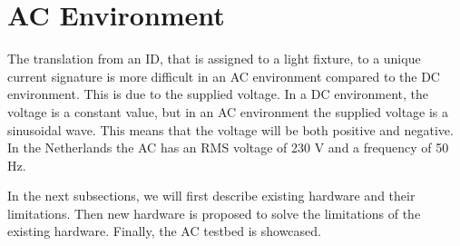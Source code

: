 
\section{AC Environment}
\label{sec:ac-environment}




The translation from an ID, that is assigned to a light fixture, to a unique current signature is more difficult in an AC environment compared to the DC environment.
This is due to the supplied voltage.
In a DC environment, the voltage is a constant value, but in an AC environment the supplied voltage is a sinusoidal wave.
This means that the voltage will be both positive and negative.
In the Netherlands the AC has an RMS voltage of 230 V and a frequency of 50 Hz.

In the next subsections, we will first describe existing hardware and their limitations.
Then new hardware is proposed to solve the limitations of the existing hardware.
Finally, the AC testbed is showcased.








